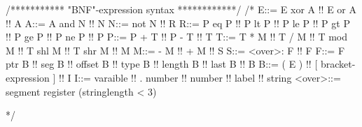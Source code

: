 
/*********** "BNF"-expression syntax ************/
/*
E::= E xor A !! E or A !! A
A::= A and N !! N
N::= not N !! R
R::= P eq P !! P lt P !! P le P !! P gt P !! P ge P !! P ne P !! P
P::= P + T !! P - T !! T
T::= T * M !! T / M !! T mod M !! T shl M !! T shr M !! M
M::= - M !! + M !! S
S::= <over>: F !! F
F::= F ptr B !! seg B !! offset B !! type B !!
     length B !! last B !! B
B::= ( E ) !! [ bracket-expression ] !! I
I::= varaible !! . number !! number !! label !! string
<over>::= segment register
(stringlength < 3)

*/
